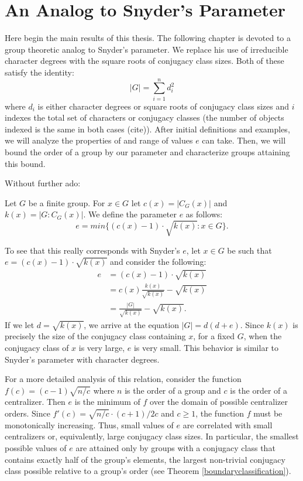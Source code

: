 \documentclass[main.tex]{subfiles}
\begin{document}
\chapter{An Analog to Snyder's Parameter}

Here begin the main results of this thesis. The following chapter is devoted to a group theoretic analog to Snyder's parameter. We replace his use of irreducible character degrees with the square roots of conjugacy class sizes. Both of these satisfy the identity:
$$|G| = \sum_{i=1}^n d_i^2$$
where $d_i$ is either character degrees or square roots of conjugacy class sizes and $i$ indexes the total set of characters or conjugacy classes (the number of objects indexed is the same in both cases (cite)). After initial definitions and examples, we will analyze the properties of and range of values $e$ can take. Then, we will bound the order of a group by our parameter and characterize groups attaining this bound.

Without further ado:

\hss

\begin{definition}
Let $G$ be a finite group. For $x \in G$ let $c(x) = |C_G(x)|$ and $k(x) = |G : C_G(x)|$. We define the parameter $e$ as follows:
$$e = min\{(c(x) - 1) \cdot \sqrt{k(x)} : x \in G\}\text{.}$$
\end{definition}

\hss

To  see that this really corresponds with Snyder's $e$, let $x \in G$ be such that $e = (c(x) - 1) \cdot \sqrt{k(x)}$ and consider the following:
\begin{align*}
e &= (c(x) - 1) \cdot \sqrt{k(x)} \\
 &= c(x)\frac{k(x)}{\sqrt{k(x)}} - \sqrt{k(x)} \\
 &= \frac{|G|}{\sqrt{k(x)}} - \sqrt{k(x)}\text{.}
\end{align*}
If we let $d = \sqrt{k(x)}$, we arrive at the equation $|G| = d (d + e)$. Since $k(x)$ is precisely the size of the conjugacy class containing $x$, for a fixed $G$, when the conjugacy class of $x$ is very large, $e$ is very small. This behavior is similar to Snyder's parameter with character degrees. 

For a more detailed analysis of this relation, consider the function $f(c) = (c - 1) \sqrt{n/c}$ where $n$ is the order of a group and $c$ is the order of a centralizer. Then $e$ is the minimum of $f$ over the domain of possible centralizer orders. Since $f'(c) = \sqrt{n/c} \cdot (c+1) / 2c$ and $c \ge 1$, the function $f$ must be monotonically increasing. Thus, small values of $e$ are correlated with small centralizers or, equivalently, large conjugacy class sizes. In particular, the smallest possible values of $e$ are attained only by groups with a conjugacy class that contains exactly half of the group's elements, the largest non-trivial conjugacy class possible relative to a group's order (see Theorem \ref{boundaryclassification}).
\end{document}
